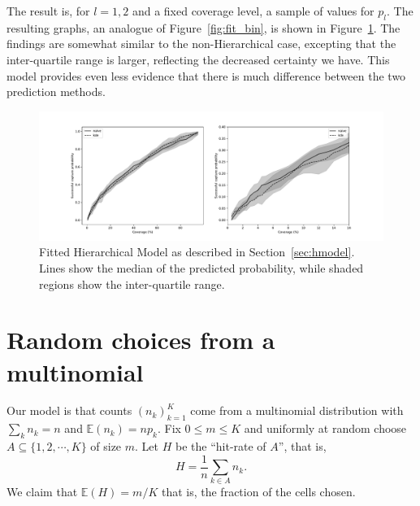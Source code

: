 \documentclass[twoside,a4paper,twocolumn,10pt]{article}
\theoremstyle{plain}
\theoremstyle{definition}
\begin{document}
The result is, for $l=1,2$ and a fixed coverage level, a sample of values for $p_l$.
The resulting graphs, an analogue of Figure~\ref{fig:fit_bin}, is shown in 
Figure~\ref{fig:fit_h_bin}.  The findings are somewhat similar to the non-Hierarchical
case, excepting that the inter-quartile range is larger, reflecting the decreased
certainty we have.  This model provides even less evidence that there is much difference
between the two prediction methods.

\begin{figure}
	\includegraphics[width=\textwidth]{../details/fit_h_bin.pdf}
  \caption{Fitted Hierarchical Model as described in Section~\ref{sec:hmodel}.
	Lines show the median of the predicted probability, while shaded regions show the
	inter-quartile range.}
   \label{fig:fit_h_bin}
\end{figure}




\appendix
\section{Random choices from a multinomial}\label{app:one}

Our model is that counts $(n_k)_{k=1}^K$ come from a multinomial distribution with
$\sum_k n_k = n$ and $\mathbb E(n_k) = np_k$.  Fix $0 \leq m \leq K$ and uniformly
at random choose $A\subseteq \{1,2,\cdots,K\}$ of size $m$.  Let $H$ be the
``hit-rate of $A$'', that is,
\[ H = \frac{1}{n} \sum_{k\in A} n_k. \]
We claim that $\mathbb E(H) = m/K$ that is, the fraction of the cells chosen.
\end{document}
